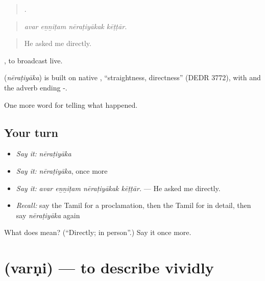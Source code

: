 \begin{quote}
   .
\end{quote}

\begin{quote}
\emph{avar eṉṉiṭam nēraṭiyākak kēṭṭār.}
\end{quote}

\begin{quote}
He asked me directly.
\end{quote}

 , to broadcast live.

\begin{cousinweb}
\textbf{} (\emph{nēraṭiyāka}) is built on native , \textquotedblleft{}straightness, directness\textquotedblright{} (DEDR 3772), with  and the adverb ending -.
\end{cousinweb}

\begin{grammarlens}[title={What you've built}]
One more word for telling what happened.
\end{grammarlens}

\subsection*{Your turn}
\begin{itemize}
\raggedright
  \item \emph{Say it:} \emph{nēraṭiyāka}
  \item \emph{Say it:} \emph{nēraṭiyāka}, once more
  \item \emph{Say it:} \emph{avar eṉṉiṭam nēraṭiyākak kēṭṭār.} — He asked me directly.
  \item \emph{Recall:} say the Tamil for a proclamation, then the Tamil for in detail, then say \emph{nēraṭiyāka} again
\end{itemize}

\begin{tcolorbox}[breakable,colback=teal!4,colframe=teal!35!black,title={Before you move on}]
What does  mean? (\textquotedblleft{}Directly; in person\textquotedblright{}.) Say it once more.
\end{tcolorbox}
\section[\texorpdfstring{\ta{வர்ணி} (varṇi)}{வர்ணி (varṇi)}]{ (varṇi) — to describe vividly}

